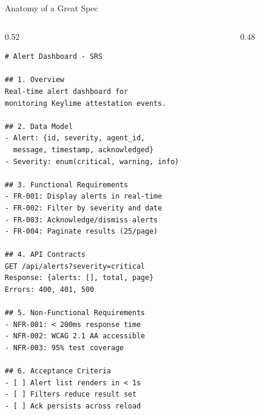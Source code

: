 \begin{frame}[fragile]{Anatomy of a Great Spec}
  \vspace{-0.6cm}
  \begin{columns}[T]
    \begin{column}{0.52\textwidth}
      \begin{lstlisting}[style=markdown, basicstyle=\ttfamily\fontsize{4}{5}\selectfont]
# Alert Dashboard - SRS

## 1. Overview
Real-time alert dashboard for
monitoring Keylime attestation events.

## 2. Data Model
- Alert: {id, severity, agent_id,
  message, timestamp, acknowledged}
- Severity: enum(critical, warning, info)

## 3. Functional Requirements
- FR-001: Display alerts in real-time
- FR-002: Filter by severity and date
- FR-003: Acknowledge/dismiss alerts
- FR-004: Paginate results (25/page)

## 4. API Contracts
GET /api/alerts?severity=critical
Response: {alerts: [], total, page}
Errors: 400, 401, 500

## 5. Non-Functional Requirements
- NFR-001: < 200ms response time
- NFR-002: WCAG 2.1 AA accessible
- NFR-003: 95% test coverage

## 6. Acceptance Criteria
- [ ] Alert list renders in < 1s
- [ ] Filters reduce result set
- [ ] Ack persists across reload
      \end{lstlisting}
    \end{column}
    \begin{column}{0.48\textwidth}
      \vspace{0.2cm}
      \begin{tikzpicture}[scale=0.65, transform shape,
          annot/.style={rectangle, draw, rounded corners, fill=keylimeblue!8,
                        text width=4.6cm, font=\scriptsize, inner sep=0.15cm}]


\end{tikzpicture}
\end{column}
\end{columns}
\end{frame}
